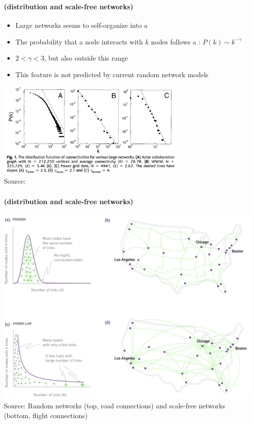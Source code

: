 \documentclass[8pt]{beamer}
\begin{document}
\begin{frame}
\frametitle{\insertsection}
\framesubtitle{\insertsubsection \hspace{0.05cm} (distribution and scale-free networks)}

\begin{itemize}
	\item Large networks seems to self-organize into a {\color{blue}{scale-free state}}
	\item The probability that a node interacts with $k$ nodes follows a {\color{blue}{power law}}: $P(k) \sim k^{-\gamma}$
	\item $2<\gamma<3$, but also outside this range
	\item This feature is not predicted by current random network models
\end{itemize}

\medskip

\centering
\includegraphics[width = 0.7\textwidth]{scale_free}\\
\tiny Source: \cite{Barabasi1999}
 
\end{frame}


\begin{frame}
\frametitle{\insertsection}
\framesubtitle{\insertsubsection \hspace{0.05cm} (distribution and scale-free networks)}

\centering
\includegraphics[height=0.8\textheight]{scale_free2}\\
\tiny{Source: Random networks (top, road connections) and scale-free networks (bottom, flight connections) \cite{Barabasi2016}}

\end{frame}
\end{document}
